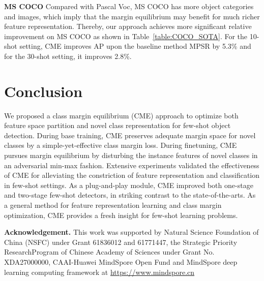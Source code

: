\documentclass[final]{cvpr}
\begin{document}
\textbf{MS COCO}
Compared with Pascal Voc, MS COCO has more object categories and images, which imply that the margin equilibrium may benefit for much richer feature representation. Thereby,  our approach achieves more significant relative improvement on MS COCO as shown in Table~\ref{table:COCO_SOTA}. For the 10-shot setting, CME improves  AP upon the baseline method MPSR by 5.3\% and for the 30-shot setting, it improves 2.8\%. 

\section{Conclusion}

We proposed a class margin equilibrium (CME) approach to optimize both feature space partition and novel class representation for few-shot object detection. During base training, CME preserves adequate margin space for novel classes by a simple-yet-effective class margin loss. During finetuning, CME pursues margin equilibrium by disturbing the instance features of novel classes in an adversarial min-max fashion. Extensive experiments validated the effectiveness of CME for alleviating the constriction of feature representation and classification in few-shot settings. As a plug-and-play module, CME improved both one-stage and two-stage few-shot detectors, in striking contrast to the state-of-the-arts. As a general method for feature representation learning and class margin optimization, CME provides a fresh insight for few-shot learning problems.

\textbf{Acknowledgement.} This work was supported by Natural Science Foundation of China (NSFC) under Grant 61836012 and 61771447, the Strategic Priority ResearchProgram of Chinese Academy of Sciences under Grant No. XDA27000000, CAAI-Huawei MindSpore Open Fund and MindSpore deep learning computing framework at \href{https://www.mindspore.cn} {\color{magenta}https://www.mindspore.cn}

{\small


}
\end{document}
